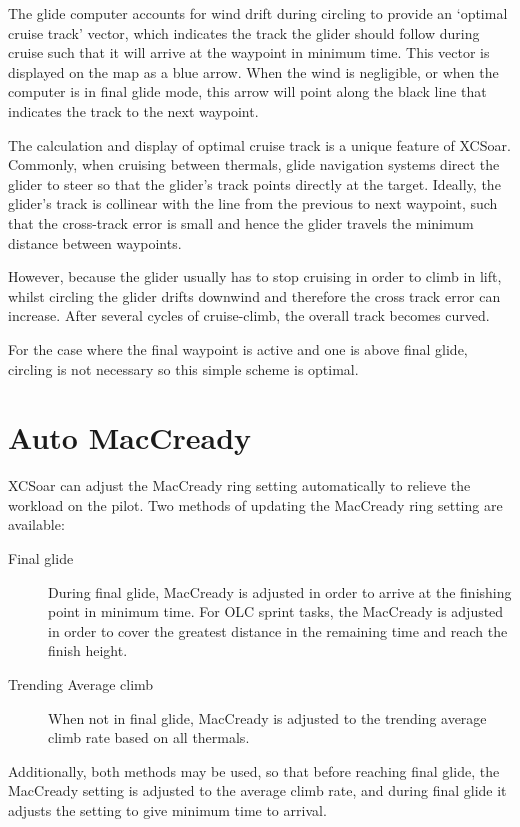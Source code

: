 \documentclass[a4paper,12pt]{refrep}
\begin{document}
The glide computer accounts for wind drift during circling to provide
an `optimal cruise track' vector, which indicates the track the glider
should follow during cruise such that it will arrive at the waypoint
in minimum time.  This vector is displayed on the map as a blue arrow.
When the wind is negligible, or when the computer is in final glide
mode, this arrow will point along the black line that indicates the
track to the next waypoint.

The calculation and display of optimal cruise track is a unique
feature of XCSoar.  Commonly, when cruising between thermals, glide
navigation systems direct the glider to steer so that the glider's
track points directly at the target.  Ideally, the glider's track is
collinear with the line from the previous to next waypoint, such that
the cross-track error is small and hence the glider travels the
minimum distance between waypoints.

However, because the glider usually has to stop cruising in order to
climb in lift, whilst circling the glider drifts downwind and
therefore the cross track error can increase.  After several cycles of
cruise-climb, the overall track becomes curved.
%

For the case where the final waypoint is active and one is above final
glide, circling is not necessary so this simple scheme is optimal.

\section{Auto MacCready}\label{sec:auto-maccready}

XCSoar can adjust the MacCready ring setting automatically to relieve the
workload on the pilot.  Two methods of updating the MacCready ring setting
are available:
\begin{description}
\item[Final glide]  During final glide, MacCready is adjusted in order to
 arrive at the finishing point in minimum time.  For OLC sprint tasks,
 the MacCready is adjusted in order to cover the greatest distance in the remaining
 time and reach the finish height.
\item[Trending Average climb] When not in final glide, MacCready is adjusted
to the trending average climb rate based on all thermals.
\end{description}
Additionally, both methods may be used, so that before reaching final glide,
the MacCready setting is adjusted to the average climb rate, and during final
glide it adjusts the setting to give minimum time to arrival.
\end{document}
